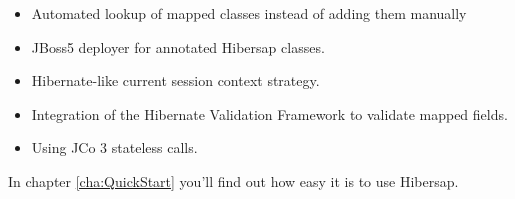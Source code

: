 \begin{itemize}
  \item Automated lookup of mapped classes instead of adding them manually
  \item JBoss5 deployer for annotated Hibersap classes.
  \item Hibernate-like current session context strategy.
  \item Integration of the Hibernate Validation Framework to validate mapped fields.  
  \item Using JCo 3 stateless calls.
\end{itemize}

In chapter \ref{cha:QuickStart} you'll find out how easy it is to use Hibersap.
